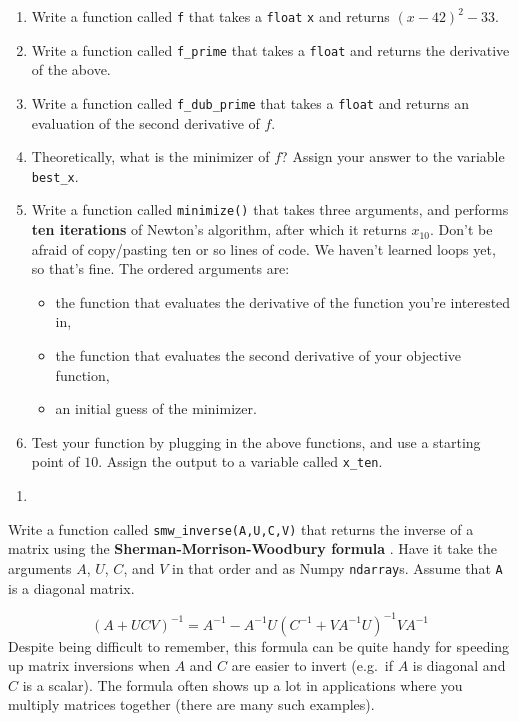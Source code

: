 \documentclass[12pt,krantz2]{krantz}
\providecommand{\tightlist}{%
  \setlength{\itemsep}{0pt}\setlength{\parskip}{0pt}}
\begin{document}
\begin{enumerate}
\def\labelenumi{\alph{enumi})}
\tightlist
\item
  Write a function called \texttt{f} that takes a \texttt{float} \texttt{x} and returns \((x-42)^2 - 33\).
\item
  Write a function called \texttt{f\_prime} that takes a \texttt{float} and returns the derivative of the above.
\item
  Write a function called \texttt{f\_dub\_prime} that takes a \texttt{float} and returns an evaluation of the second derivative of \(f\).
\item
  Theoretically, what is the minimizer of \(f\)? Assign your answer to the variable \texttt{best\_x}.
\item
  Write a function called \texttt{minimize()} that takes three arguments, and performs \textbf{ten iterations} of Newton's algorithm, after which it returns \(x_{10}\). Don't be afraid of copy/pasting ten or so lines of code. We haven't learned loops yet, so that's fine. The ordered arguments are:

  \begin{itemize}
  \tightlist
  \item
    the function that evaluates the derivative of the function you're interested in,
  \item
    the function that evaluates the second derivative of your objective function,
  \item
    an initial guess of the minimizer.
  \end{itemize}
\item
  Test your function by plugging in the above functions, and use a starting point of \(10\). Assign the output to a variable called \texttt{x\_ten}.
\end{enumerate}

\begin{enumerate}
\def\labelenumi{\arabic{enumi}.}
\setcounter{enumi}{1}
\item
\end{enumerate}

Write a function called \texttt{smw\_inverse(A,U,C,V)} that returns the inverse of a matrix using the \textbf{Sherman-Morrison-Woodbury formula} \citep{woodbury}. Have it take the arguments \(A\), \(U\), \(C\), and \(V\) in that order and as Numpy \texttt{ndarray}s. Assume that \texttt{A} is a diagonal matrix.

\begin{equation} 
(A + UCV)^{-1} = A^{-1} - A^{-1}U(C^{-1} + VA^{-1}U)^{-1}V A^{-1}
\end{equation}
Despite being difficult to remember, this formula can be quite handy for speeding up matrix inversions when \(A\) and \(C\) are easier to invert (e.g.~if \(A\) is diagonal and \(C\) is a scalar). The formula often shows up a lot in applications where you multiply matrices together (there are many such examples).
\end{document}
